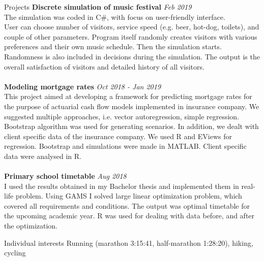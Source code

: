 \documentclass{resume} %
\begin{document}
\begin{rSection}{Projects}
{\bf Discrete simulation of music festival} \hfill {\em Feb 2019}\\
The simulation was coded in C\#, with focus on user-friendly interface.\\
User can choose number of visitors, service speed (e.g. beer, hot-dog, toilets), and couple of other parameters. Program itself randomly creates visitors with various preferences and their own music schedule. Then the simulation starts. Randomness is also included in decisions during the simulation. The output is the overall satisfaction of visitors and detailed history of all visitors.\\
\\{\bf Modeling mortgage rates} \hfill {\em Oct 2018 - Jan 2019}\\
This project aimed at developing a framework for predicting mortgage rates for the purpose of actuarial cash flow models implemented in insurance company. We suggested multiple approaches, i.e. vector autoregression, simple regression. Bootstrap algorithm was used for generating scenarios. In addition, we dealt with client specific data of the insurance company. We used R and EViews for regression. Bootstrap and simulations were made in MATLAB. Client specific data were analysed in R.\\
\\{\bf Primary school timetable} \hfill {\em Aug 2018}\\
I used the results obtained in my Bachelor thesis and implemented them in real-life problem. Using GAMS I solved large linear optimization problem, which covered all requirements and conditions. The output was optimal timetable for the upcoming academic year. R was used for dealing with data before, and after the optimization.
\end{rSection}

\begin{rSection}{Individual interests}
Running (marathon 3:15:41, half-marathon 1:28:20), hiking, cycling
\end{rSection}
\end{document}

